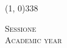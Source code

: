 \documentclass[../thesis.tex]{subfiles}
\begin{document}
\begin{titlepage}
\begin{center}
            \line(1, 0){338} \\
            
            \begin{normalsize}
                \textsc{Sessione \mySession}\\
                \textsc{Academic year \myAY}
            \end{normalsize}

        \end{center}
    \end{titlepage}
\end{document}
